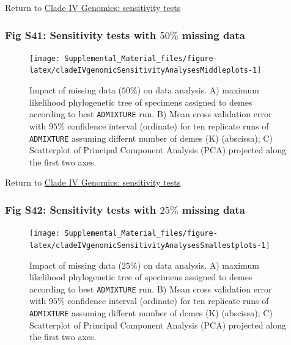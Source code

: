 \documentclass[
  11pt,
]{article}
\begin{document}
Return to \protect\hyperlink{sensitivity-tests-3}{Clade IV Genomics: sensitivity tests}
\pagebreak

\hypertarget{fig-s41-sensitivity-tests-with-50-missing-data}{%
\subsubsection{\texorpdfstring{Fig S41: Sensitivity tests with \(50\%\) missing data}{Fig S41: Sensitivity tests with 50\textbackslash\% missing data}}\label{fig-s41-sensitivity-tests-with-50-missing-data}}

\begin{figure}
\texttt{[image: Supplemental\_Material\_files/figure-latex/cladeIVgenomicSensitivityAnalysesMiddleplots-1]} \caption{Impact of missing data ($50\%$) on data analysis. A) maximum likelihood phylogenetic tree of specimens assigned to demes according to best \texttt{ADMIXTURE} run. B) Mean cross validation error with $95\%$ confidence interval (ordinate) for ten replicate runs of \texttt{ADMIXTURE} assuming differnt number of demes (K) (abscissa); C) Scatterplot of Principal Component Analysis (PCA) projected along the first two axes.}\label{fig:cladeIVgenomicSensitivityAnalysesMiddleplots}
\end{figure}

Return to \protect\hyperlink{sensitivity-tests-3}{Clade IV Genomics: sensitivity tests}
\pagebreak

\hypertarget{fig-s42-sensitivity-tests-with-25-missing-data}{%
\subsubsection{\texorpdfstring{Fig S42: Sensitivity tests with \(25\%\) missing data}{Fig S42: Sensitivity tests with 25\textbackslash\% missing data}}\label{fig-s42-sensitivity-tests-with-25-missing-data}}

\begin{figure}
\texttt{[image: Supplemental\_Material\_files/figure-latex/cladeIVgenomicSensitivityAnalysesSmallestplots-1]} \caption{Impact of missing data ($25\%$) on data analysis. A) maximum likelihood phylogenetic tree of specimens assigned to demes according to best \texttt{ADMIXTURE} run. B) Mean cross validation error with $95\%$ confidence interval (ordinate) for ten replicate runs of \texttt{ADMIXTURE} assuming differnt number of demes (K) (abscissa); C) Scatterplot of Principal Component Analysis (PCA) projected along the first two axes.}\label{fig:cladeIVgenomicSensitivityAnalysesSmallestplots}
\end{figure}
\end{document}
